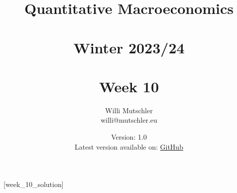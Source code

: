 
\newif\ifDisplaySolutions%


\title{Quantitative Macroeconomics\\~\\Winter 2023/24\\~\\Week 10}
\author{Willi Mutschler\\willi@mutschler.eu}
\date{Version: 1.0\\Latest version available on: \href{https://github.com/wmutschl/Quantitative-Macroeconomics/releases/latest/download/week_10.pdf}{GitHub}}
\maketitle\thispagestyle{empty}

\newpage
{}[week_10_solution]
\tableofcontents\thispagestyle{empty}\newpage

\setcounter{page}{1}
\newpage
\newpage

\printbibliography
\newpage

\ifDisplaySolutions
\newpage
\appendix
\section{Solutions}

\fi
